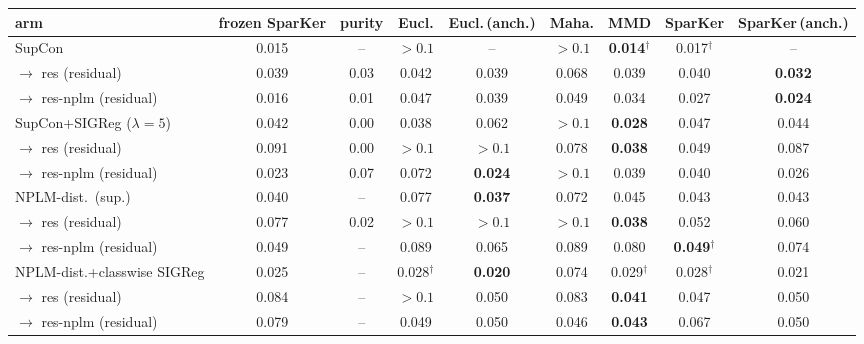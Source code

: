 \begin{table}[t]
\centering
\footnotesize
\begin{tabular}{lcccccccc}
\toprule
arm & frozen SparKer & purity & Eucl. & Eucl.\,(anch.) & Maha. & MMD & SparKer & SparKer\,(anch.) \\
\midrule
SupCon & 0.015 & -- & $>0.1$ & -- & $>0.1$ & \textbf{0.014$^\dagger$} & 0.017$^\dagger$ & -- \\
\quad $\to$ res (residual) & 0.039 & 0.03 & 0.042 & 0.039 & 0.068 & 0.039 & 0.040 & \textbf{0.032} \\
\quad $\to$ res-nplm (residual) & 0.016 & 0.01 & 0.047 & 0.039 & 0.049 & 0.034 & 0.027 & \textbf{0.024} \\
\addlinespace
SupCon+SIGReg ($\lambda{=}5$) & 0.042 & 0.00 & 0.038 & 0.062 & $>0.1$ & \textbf{0.028} & 0.047 & 0.044 \\
\quad $\to$ res (residual) & 0.091 & 0.00 & $>0.1$ & $>0.1$ & 0.078 & \textbf{0.038} & 0.049 & 0.087 \\
\quad $\to$ res-nplm (residual) & 0.023 & 0.07 & 0.072 & \textbf{0.024} & $>0.1$ & 0.039 & 0.040 & 0.026 \\
\addlinespace
NPLM-dist.\ (sup.) & 0.040 & -- & 0.077 & \textbf{0.037} & 0.072 & 0.045 & 0.043 & 0.043 \\
\quad $\to$ res (residual) & 0.077 & 0.02 & $>0.1$ & $>0.1$ & $>0.1$ & \textbf{0.038} & 0.052 & 0.060 \\
\quad $\to$ res-nplm (residual) & 0.049 & -- & 0.089 & 0.065 & 0.089 & 0.080 & \textbf{0.049$^\dagger$} & 0.074 \\
\addlinespace
NPLM-dist.+classwise SIGReg & 0.025 & -- & 0.028$^\dagger$ & \textbf{0.020} & 0.074 & 0.029$^\dagger$ & 0.028$^\dagger$ & 0.021 \\
\quad $\to$ res (residual) & 0.084 & -- & $>0.1$ & 0.050 & 0.083 & \textbf{0.041} & 0.047 & 0.050 \\
\quad $\to$ res-nplm (residual) & 0.079 & -- & 0.049 & 0.050 & 0.046 & \textbf{0.043} & 0.067 & 0.050 \\
\bottomrule
\end{tabular}

\end{table}
